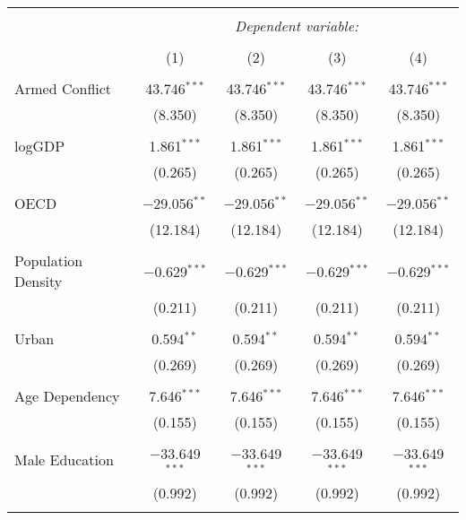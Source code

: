 
\begin{table}[!htbp] \centering 
  \caption{} 
  \label{} 
\begin{tabular}{@{\extracolsep{5pt}}lcccc} 
\\[-1.8ex]\hline 
\hline \\[-1.8ex] 
 & \multicolumn{4}{c}{\textit{Dependent variable:}} \\ 
\cline{2-5} 
\\[-1.8ex] & (1) & (2) & (3) & (4)\\ 
\hline \\[-1.8ex] 
 Armed Conflict & 43.746$^{***}$ & 43.746$^{***}$ & 43.746$^{***}$ & 43.746$^{***}$ \\ 
  & (8.350) & (8.350) & (8.350) & (8.350) \\ 
  & & & & \\ 
 logGDP & 1.861$^{***}$ & 1.861$^{***}$ & 1.861$^{***}$ & 1.861$^{***}$ \\ 
  & (0.265) & (0.265) & (0.265) & (0.265) \\ 
  & & & & \\ 
 OECD & $-$29.056$^{**}$ & $-$29.056$^{**}$ & $-$29.056$^{**}$ & $-$29.056$^{**}$ \\ 
  & (12.184) & (12.184) & (12.184) & (12.184) \\ 
  & & & & \\ 
 Population Density & $-$0.629$^{***}$ & $-$0.629$^{***}$ & $-$0.629$^{***}$ & $-$0.629$^{***}$ \\ 
  & (0.211) & (0.211) & (0.211) & (0.211) \\ 
  & & & & \\ 
 Urban & 0.594$^{**}$ & 0.594$^{**}$ & 0.594$^{**}$ & 0.594$^{**}$ \\ 
  & (0.269) & (0.269) & (0.269) & (0.269) \\ 
  & & & & \\ 
 Age Dependency & 7.646$^{***}$ & 7.646$^{***}$ & 7.646$^{***}$ & 7.646$^{***}$ \\ 
  & (0.155) & (0.155) & (0.155) & (0.155) \\ 
  & & & & \\ 
 Male Education & $-$33.649$^{***}$ & $-$33.649$^{***}$ & $-$33.649$^{***}$ & $-$33.649$^{***}$ \\ 
  & (0.992) & (0.992) & (0.992) & (0.992) \\ 
  & & & & \\ 

\end{tabular}
\end{table}
